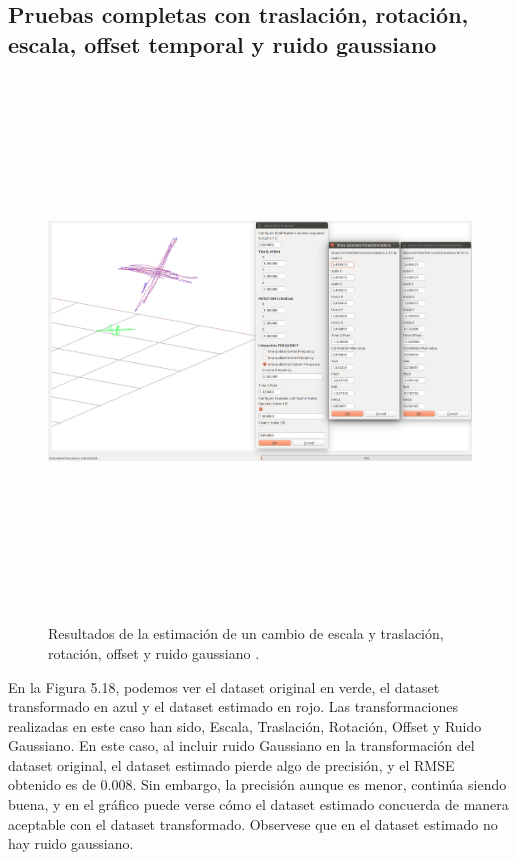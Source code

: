 \subsection{Pruebas completas con traslación, rotación, escala, offset temporal y ruido gaussiano}
\begin{figure}[H]
\begin{center}
\label{fig:opciones de View}\includegraphics[height=14.0cm,width=18.0cm]{img/cap6/Escala_Trasla_Rota_Offset_GaussNoise_abba.png}
\hspace{0.5cm}

\end{center}

\caption{Resultados de la estimación de un cambio de escala y traslación, rotación, offset y ruido gaussiano .}
\end{figure}
En la Figura 5.18, podemos ver el dataset original en verde, el dataset transformado en azul y el dataset estimado en rojo.
Las transformaciones realizadas en este caso han sido, Escala, Traslación, Rotación, Offset y Ruido Gaussiano.
En este caso, al incluir ruido Gaussiano en la transformación del dataset original, el dataset estimado pierde algo de precisión, y el RMSE obtenido es de  0.008.
Sin embargo, la precisión aunque es menor, continúa siendo buena, y en el gráfico puede verse cómo el dataset estimado concuerda de manera aceptable con el dataset transformado. Observese que en el dataset estimado no hay ruido gaussiano.
